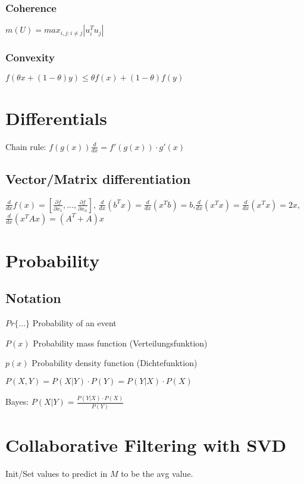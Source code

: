 \documentclass[11pt,twocolumn]{article}
\begin{document}
\subsubsection{Coherence}

$m(U)= max_{i,j:i\neq j} | u_i^T u_j|$

\subsubsection{Convexity}

$f(\theta x + (1-\theta)y) \leq \theta f(x) + (1-\theta) f(y)$

\section{Differentials}

Chain rule: $ f(g(x)) \frac{d}{dx} = f'(g(x)) \cdot g'(x)$

\subsection{Vector/Matrix differentiation}

$\frac{d}{dx} f(x) = \left[ \frac{\partial f }{\partial x_1} ,...,\frac{\partial f}{\partial x_n} \right]$, $\frac{d}{dx}(b^T x) = \frac{d}{dx} (x^T b) = b$,$\frac{d}{dx}(x^T x) = \frac{d}{dx} (x^T x) = 2x$,$\frac{d}{dx}(x^T A x) = (A^T + A) x$

\section{Probability}

\subsection{Notation}
$Pr\lbrace ... \rbrace$ Probability of an event

$P(x)$ Probability mass function (Verteilungsfunktion)

$p(x)$ Probability density function (Dichtefunktion)

$P(X,Y) = P(X|Y) \cdot P(Y) = P(Y|X) \cdot P(X)$

Bayes: $P(X|Y) = \frac{P(Y|X)\cdot P(X)}{P(Y)}$


\section{Collaborative Filtering with SVD}
Init/Set values to predict in $M$ to be the avg value.
\end{document}
